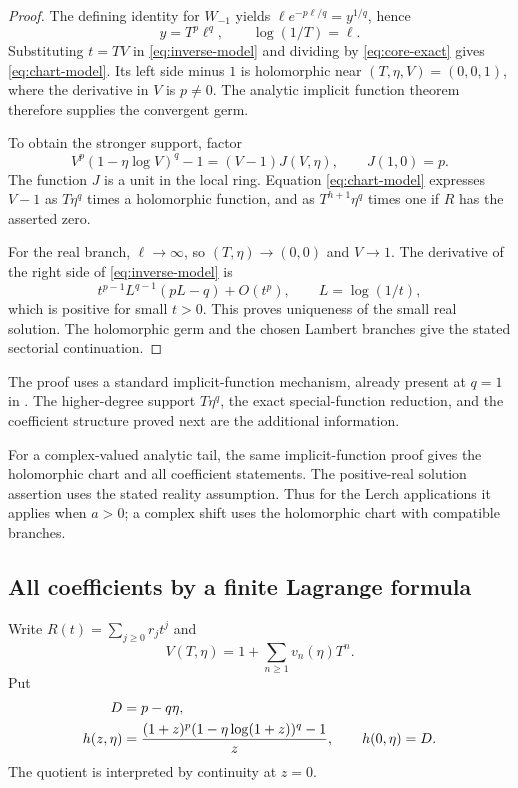 \documentclass[11pt,a4paper]{article}
\numberwithin{equation}{section}
\theoremstyle{definition}
\theoremstyle{remark}
\begin{document}
\begin{proof}
The defining identity for $W_{-1}$ yields
$\ell e^{-p\ell/q}=y^{1/q}$, hence
\begin{equation}\label{eq:core-exact}
 y=T^p\ell^q,\qquad \log(1/T)=\ell.
\end{equation}
Substituting $t=TV$ in \eqref{eq:inverse-model} and dividing by
\eqref{eq:core-exact} gives \eqref{eq:chart-model}. Its left side
minus $1$ is holomorphic near $(T,\eta,V)=(0,0,1)$, where the
derivative in $V$ is $p\ne0$. The analytic implicit function theorem
therefore supplies the convergent germ.

To obtain the stronger support, factor
\[
 V^p(1-\eta\log V)^q-1=(V-1)J(V,\eta),
 \qquad J(1,0)=p.
\]
The function $J$ is a unit in the local ring. Equation
\eqref{eq:chart-model} expresses $V-1$ as $T\eta^q$ times a
holomorphic function, and as $T^{h+1}\eta^q$ times one if $R$ has
the asserted zero.

For the real branch, $\ell\to\infty$, so $(T,\eta)\to(0,0)$ and
$V\to1$. The derivative of the right side of
\eqref{eq:inverse-model} is
\[
 t^{p-1}L^{q-1}(pL-q)+O(t^p),\qquad L=\log(1/t),
\]
which is positive for small $t>0$. This proves uniqueness of the
small real solution. The holomorphic germ and the chosen Lambert
branches give the stated sectorial continuation.
\end{proof}

The proof uses a standard implicit-function mechanism, already present
at $q=1$ in \cite{repo-lambert}. The higher-degree support
$T\eta^q$, the exact special-function reduction, and the coefficient
structure proved next are the additional information.

For a complex-valued analytic tail, the same implicit-function proof
gives the holomorphic chart and all coefficient statements. The
positive-real solution assertion uses the stated reality assumption.
Thus for the Lerch applications it applies when $a>0$; a complex shift
uses the holomorphic chart with compatible branches.

\subsection{All coefficients by a finite Lagrange formula}

Write $R(t)=\sum_{j\ge0}r_jt^j$ and
\begin{equation}\label{eq:V-expansion}
 V(T,\eta)=1+\sum_{n\ge1}v_n(\eta)T^n.
\end{equation}
Put
\begin{align}
 D&=p-q\eta,\notag\\
 h(z,\eta)&=\frac{(1+z)^p(1-\eta\log(1+z))^q-1}{z},
 \qquad h(0,\eta)=D.\label{eq:h-inverse}
\end{align}
The quotient is interpreted by continuity at $z=0$.
\end{document}
